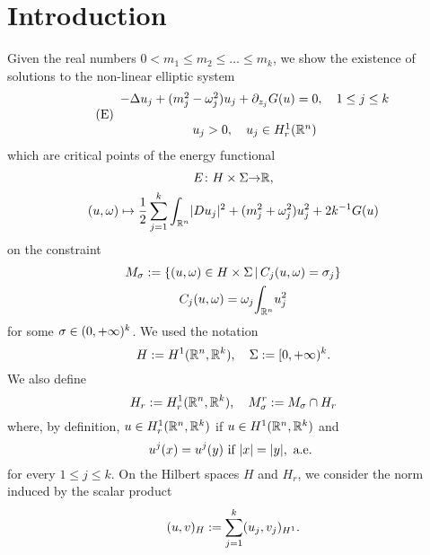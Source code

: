 \documentclass[a4paper,12pt,oneside]{amsart}
\theoremstyle{definition}
\theoremstyle{remark}
\theoremstyle{theorem}
\begin{document}
\section*{Introduction}
\thispagestyle{empty}
\noindent
Given the real numbers $ 0 < m_1\leq m_2\leq\dots\leq m_k $, 
we show the existence of solutions to the non-linear elliptic system 
\[
\label{eq:E}
\tag{E}
\begin{array}{c}
-\Delta u_j + (m_j \sp 2 - {\mathbf{\omega}}_j\sp 2) u_j
+ {\partial}_{z_j} {G}(u) = 0,\quad 1\leq j\leq k\\\\
u_j > 0,\quad u_j\in H\sp 1 _r ({{\mathbb{R}}\sp{n}})
\end{array}
\]
which are critical points of the energy functional 
\begin{gather*}
E\colon{H}\times\Sigma{\rightarrow}{\mathbb{R}},\\
(u,{\mathbf{\omega}})\mapsto \frac{1}{2}\sum_{j = 1}\sp k
{\int_{{\mathbb{R}}\sp{n}}} |{D} u_j|\sp 2 + (m_j\sp 2 + {\mathbf{\omega}}_j\sp 2) u_j\sp 2 + 2k\sp {-1}
{G}(u)
\end{gather*}
on the constraint
\begin{gather*}
{M}_{\sigma} := \{(u,{\mathbf{\omega}})\in{H}\times\Sigma\,|\,{C}_j (u,{\mathbf{\omega}}) = {\sigma}_j\}\\
{C}_j (u,{\mathbf{\omega}}) = {\mathbf{\omega}}_j {\int_{{\mathbb{R}}\sp{n}}} u_j\sp 2
\end{gather*}
for some $ {\sigma}\in (0,+\infty)\sp k $. We used the notation
\[
{H} := H\sp 1 ({{\mathbb{R}}\sp{n}},{\mathbb{R}}\sp k),\quad\Sigma := [0,+\infty)\sp k.
\]
We also define
\[
H_r := H\sp 1 _r ({{\mathbb{R}}\sp{n}},{\mathbb{R}}\sp k),\quad M_{\sigma} \sp r := M_{\sigma}\cap H_r
\]
where, by definition, $ u\in H\sp 1 _r ({{\mathbb{R}}\sp{n}},{\mathbb{R}}\sp k ) $ if
$ u\in H\sp 1 ({{\mathbb{R}}\sp{n}},{\mathbb{R}}\sp k) $ and
\[
u\sp j (x) = u\sp j (y)\text{ if } |x| = |y|,\text{ a.e. }
\]
for every $ 1\leq j\leq k $. On the Hilbert spaces $ H $ and
$ H_r $, we consider the norm induced by the scalar product
\[
(u,v)_H := \sum_{j = 1} \sp k (u_j,v_j)_{H\sp 1}.
\]
\end{document}
